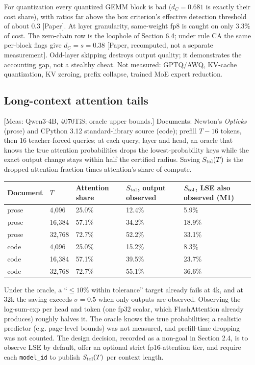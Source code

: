\documentclass[10pt]{article}
\begin{document}
For quantization every quantized GEMM block is bad ($d_C=0.681$ is exactly their cost share), with ratios far above the box criterion's effective detection threshold of about $0.3$ [Paper]. At layer granularity, same-weight fp8 is caught on only 3.3\% of cost. The zero-chain row is the loophole of Section 6.4; under rule CA the same per-block flags give $d_C=s=0.38$ [Paper, recomputed, not a separate measurement]. Odd-layer skipping destroys output quality; it demonstrates the accounting gap, not a stealthy cheat. Not measured: GPTQ/AWQ, KV-cache quantization, KV zeroing, prefix collapse, trained MoE expert reduction.

\subsection{Long-context attention tails}
[Meas: Qwen3-4B, 4070TiS; oracle upper bounds.] Documents: Newton's \emph{Opticks} (prose) and CPython 3.12 standard-library source (code); prefill $T-16$ tokens, then 16 teacher-forced queries; at each query, layer and head, an oracle that knows the true attention probabilities drops the lowest-probability keys while the exact output change stays within half the certified radius. Saving $S_{\rm tol}(T)$ is the dropped attention fraction times attention's share of compute.

\begin{center}\small
\begin{tabularx}{\linewidth}{YYYYY}
\toprule
{}\textbf{Document} & {}\textbf{$T$} & {}\textbf{Attention share} & {}\textbf{$S_{\rm tol}$, output observed} & {}\textbf{$S_{\rm tol}$, LSE also observed (M1)} \\
\midrule
{}prose & {}4,096 & {}25.0\% & {}12.4\% & {}5.9\% \\
{}prose & {}16,384 & {}57.1\% & {}34.2\% & {}18.9\% \\
{}prose & {}32,768 & {}72.7\% & {}52.2\% & {}33.1\% \\
{}code & {}4,096 & {}25.0\% & {}15.2\% & {}8.3\% \\
{}code & {}16,384 & {}57.1\% & {}39.5\% & {}23.7\% \\
{}code & {}32,768 & {}72.7\% & {}55.1\% & {}36.6\% \\
\bottomrule
\end{tabularx}
\end{center}

Under the oracle, a ``$\le10\%$ within tolerance'' target already fails at 4k, and at 32k the saving exceeds $\sigma=0.5$ when only outputs are observed. Observing the log-sum-exp per head and token (one fp32 scalar, which FlashAttention already produces) roughly halves it. The oracle knows the true probabilities; a realistic predictor (e.g. page-level bounds) was not measured, and prefill-time dropping was not counted. The design decision, recorded as a non-goal in Section 2.4, is to observe LSE by default, offer an optional strict fp16-attention tier, and require each \texttt{model\_\allowbreak{}id} to publish $S_{\rm tol}(T)$ per context length.
\end{document}
